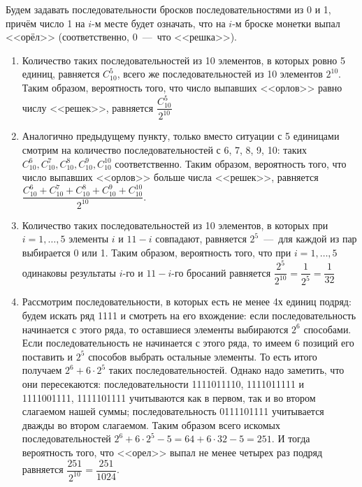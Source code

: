 \documentclass[a4paper,12pt]{article}
\begin{document}
\begin{solution}
	Будем задавать последовательности бросков последовательностями из 0 и 1, причём число 1 на $i$-м месте будет означать, что на $i$-м броске монетки выпал <<орёл>> (соответственно, 0~---~что <<решка>>). 
	\begin{enumerate}
		\item Количество таких последовательностей из 10 элементов, в которых ровно 5 единиц, равняется $C_{10}^5$, всего же последовательностей из 10 элементов $2^{10}$. Таким образом, вероятность того, что  число выпавших <<орлов>>  равно числу <<решек>>, равняется $\dfrac{C_{10}^5}{2^{10}}$
		
		\item Аналогично предыдущему пункту, только вместо ситуации с 5 единицами смотрим на количество последовательностей с 6, 7, 8, 9, 10: таких $C_{10}^6, C_{10}^7, C_{10}^8, C_{10}^9, C_{10}^{10}$ соответственно. Таким образом, вероятность того, что  число выпавших <<орлов>>  больше числа <<решек>>, равняется $\dfrac{C_{10}^6 + C_{10}^7 + C_{10}^8 + C_{10}^9 + C_{10}^{10}}{2^{10}}$.
		
		\item Количество таких последовательностей из 10 элементов, в которых при $i=1,\dots,5$ элементы $i$ и $11-i$ совпадают, равняется $2^5$~---~для каждой из пар выбирается 0 или 1. Таким образом, вероятность того, что при $i=1,\dots,5$ одинаковы результаты $i$-го и $11-i$-го бросаний равняется $\dfrac{2^5}{2^{10}} = \dfrac{1}{2^5} = \dfrac{1}{32}$
		
		\item Рассмотрим последовательности, в которых есть не менее 4х единиц подряд: будем искать ряд 1111 и смотреть на его вхождение: если последовательность начинается с этого ряда, то оставшиеся элементы выбираются $2^6$ способами. Если последовательность не начинается с этого ряда, то имеем 6 позиций его поставить и $2^5$ способов выбрать остальные элементы. То есть итого получаем $2^6 + 6\cdot 2^5$ таких последовательностей. Однако надо заметить, что они пересекаются: последовательности 1111011110, 1111011111 и 1111001111, 1111101111 учитываются как в первом, так и во втором слагаемом нашей суммы; последовательность 0111101111 учитывается дважды во втором слагаемом. Таким образом всего искомых последовательностей $2^6 + 6\cdot 2^5 - 5 = 64 + 6\cdot 32 - 5 = 251$. И тогда вероятность того, что <<орел>> выпал не менее четырех раз подряд равняется $\dfrac{251}{2^{10}} = \dfrac{251}{1024}.$
\end{enumerate}	
\end{solution}
\end{document}
